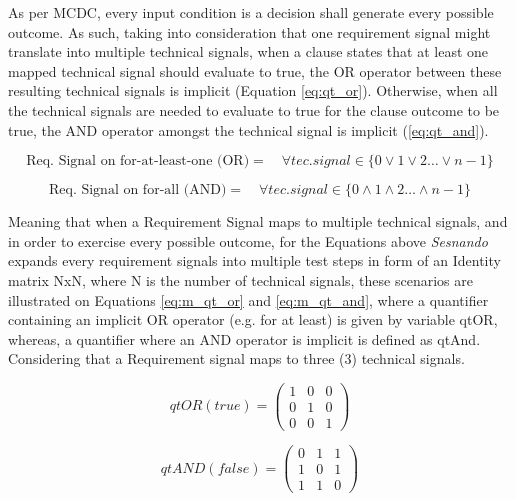 As per MCDC, every input condition is a decision shall generate every possible outcome. As such, taking into consideration that one requirement signal might translate into multiple technical signals, when a clause states that at least one mapped technical signal should evaluate to true, the OR operator between these resulting technical signals is implicit (Equation \ref{eq:qt_or}). Otherwise, when all the technical signals are needed to evaluate to true for the clause outcome to be true, the AND operator amongst the technical signal is implicit (\ref{eq:qt_and}).


\begin{equation} \label{eq:qt_or}
    \text{Req. Signal on for-at-least-one (OR)} = \quad \forall tec.signal \in \{0 \lor 1 \lor 2 \dots \lor n-1\}
\end{equation}

\begin{equation} \label{eq:qt_and}
    \text{Req. Signal on for-all (AND)} = \quad \forall tec.signal \in \{0 \land 1 \land 2 \dots \land n-1\}
\end{equation}

Meaning that when a Requirement Signal maps to multiple technical signals, and in order to exercise every possible outcome, for the Equations above \textit{Sesnando} expands every requirement signals into multiple test steps in form of an Identity matrix NxN, where N is the number of technical signals, these scenarios are illustrated on Equations \ref{eq:m_qt_or} and \ref{eq:m_qt_and}, where a quantifier containing an implicit OR operator (e.g. for at least) is given by variable qtOR, whereas, a quantifier where an AND operator is implicit is defined as qtAnd. Considering that a Requirement signal maps to three (3) technical signals.


\begin{equation} \label{eq:m_qt_or}
qtOR (true) =
\begin{pmatrix}
1 & 0 & 0\\
0 & 1 & 0\\
0 & 0 & 1
\end{pmatrix}
\end{equation}

\begin{equation} \label{eq:m_qt_and}
qtAND (false) =
\begin{pmatrix}
0 & 1 & 1\\
1 & 0 & 1\\
1 & 1 & 0
\end{pmatrix}
\end{equation}

